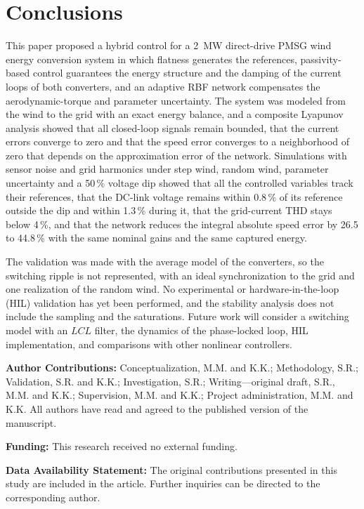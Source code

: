 \documentclass[11pt,a4paper]{article}
\begin{document}
\section{Conclusions}
This paper proposed a hybrid control for a 2~MW direct-drive PMSG wind energy conversion system in which
flatness generates the references, passivity-based control guarantees the energy structure and the
damping of the current loops of both converters, and an adaptive RBF network compensates the
aerodynamic-torque and parameter uncertainty. The system was modeled from the wind to the grid with an
exact energy balance, and a composite Lyapunov analysis showed that all closed-loop signals remain bounded,
that the current errors converge to zero and that the speed error converges to a neighborhood of zero
that depends on the approximation error of the network. Simulations with sensor noise and grid harmonics
under step wind, random wind, parameter uncertainty and a 50\,\% voltage dip showed that all the controlled
variables track their references, that the DC-link voltage remains within 0.8\,\% of its reference outside
the dip and within 1.3\,\% during it, that the grid-current THD stays below 4\,\%, and that the network
reduces the integral absolute speed error by 26.5 to 44.8\,\% with the same nominal gains and the same
captured energy.

The validation was made with the average model of the converters, so the switching ripple is not
represented, with an ideal synchronization to the grid and one realization of the random wind. No
experimental or hardware-in-the-loop (HIL) validation has yet been performed, and the stability analysis
does not include the sampling and the saturations. Future work will consider a switching model with an
$LCL$ filter, the dynamics of the phase-locked loop, HIL implementation, and comparisons with other
nonlinear controllers.

\vspace{10pt}
\noindent\small\textbf{Author Contributions:} Conceptualization, M.M. and K.K.; Methodology, S.R.;
Validation, S.R. and K.K.; Investigation, S.R.; Writing---original draft, S.R., M.M. and K.K.;
Supervision, M.M. and K.K.; Project administration, M.M. and K.K. All authors have read and agreed to the
published version of the manuscript.

\noindent\textbf{Funding:} This research received no external funding.

\noindent\textbf{Data Availability Statement:} The original contributions presented in this study are
included in the article. Further inquiries can be directed to the corresponding author.
\end{document}
